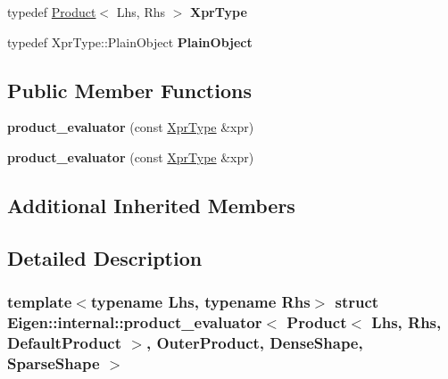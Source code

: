 \begin{DoxyCompactItemize}
typedef \hyperlink{group___core___module_class_eigen_1_1_product}{Product}$<$ Lhs, Rhs $>$ {\bfseries Xpr\+Type}
\item 
\mbox{\label{struct_eigen_1_1internal_1_1product__evaluator_3_01_product_3_01_lhs_00_01_rhs_00_01_default_pro2587512d8613ab7eaf4e89d5bc171599_a05fa80992891535caf1d41c40670754c}} 
typedef Xpr\+Type\+::\+Plain\+Object {\bfseries Plain\+Object}
\end{DoxyCompactItemize}
\subsection*{Public Member Functions}
\begin{DoxyCompactItemize}
\item 
\mbox{\label{struct_eigen_1_1internal_1_1product__evaluator_3_01_product_3_01_lhs_00_01_rhs_00_01_default_pro2587512d8613ab7eaf4e89d5bc171599_a8ccfa8eb6b5fbf881a53e72b3d75f2f1}} 
{\bfseries product\+\_\+evaluator} (const \hyperlink{group___core___module}{Xpr\+Type} \&xpr)
\item 
\mbox{\label{struct_eigen_1_1internal_1_1product__evaluator_3_01_product_3_01_lhs_00_01_rhs_00_01_default_pro2587512d8613ab7eaf4e89d5bc171599_a8ccfa8eb6b5fbf881a53e72b3d75f2f1}} 
{\bfseries product\+\_\+evaluator} (const \hyperlink{group___core___module}{Xpr\+Type} \&xpr)
\end{DoxyCompactItemize}
\subsection*{Additional Inherited Members}


\subsection{Detailed Description}
\subsubsection*{template$<$typename Lhs, typename Rhs$>$\newline
struct Eigen\+::internal\+::product\+\_\+evaluator$<$ Product$<$ Lhs, Rhs, Default\+Product $>$, Outer\+Product, Dense\+Shape, Sparse\+Shape $>$}



